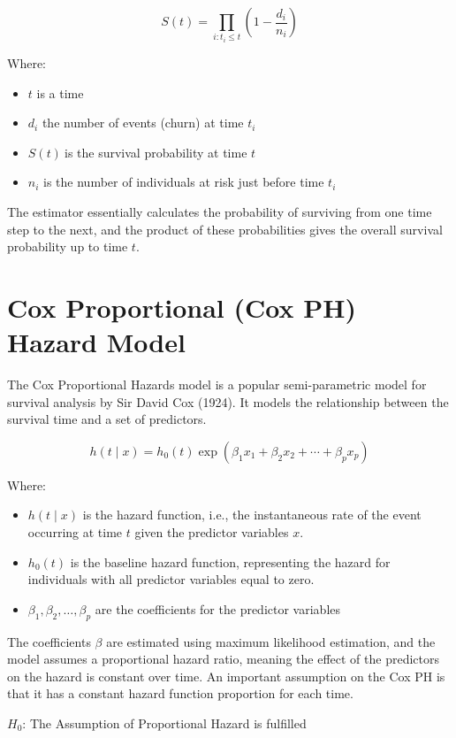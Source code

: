 \documentclass[12pt]{report} %
\begin{document}
\[S\left(t\right)=\prod_{i:t_i\le t}\left(1-\frac{d_i}{n_i}\right)\]

Where:
 \begin{itemize}
     \item \(t\) is a time
     \item \(d_i \) the number of events (churn) at time \(t_i\)
     \item \(S\left(t\right)\ \)is the survival probability at time \(t\)
     \item \(n_i\) is the number of individuals at risk just before time \(t_i\)
 \end{itemize}
The estimator essentially calculates the probability of surviving from one time step to the next, and the product of these probabilities gives the overall survival probability up to time \(t\).

\section{Cox Proportional (Cox PH) Hazard Model}

The Cox Proportional Hazards model is a popular semi-parametric model for survival analysis by Sir David Cox (1924). It models the relationship between the survival time and a set of predictors.

\[
h\left(t \mid x\right) = h_0(t) \exp(\beta_1 x_1 + \beta_2 x_2 + \cdots + \beta_p x_p)
\]

Where:
 \begin{itemize}
     \item \(h(t\mid x)\) is the hazard function, i.e., the instantaneous rate of the event occurring at time \(t\) given the predictor variables \(x\).
     \item \(h_0\left(t\right)\) is the baseline hazard function, representing the hazard for individuals with all predictor variables equal to zero.
     \item \(\beta_1,\beta_2,\ldots,\beta_p\) are the coefficients for the predictor variables
 \end{itemize}

 The coefficients \(\beta\) are estimated using maximum likelihood estimation, and the model assumes a proportional hazard ratio, meaning the effect of the predictors on the hazard is constant over time.
An important assumption on the Cox PH is that it has a constant hazard function proportion for each time.



                                                                \(H_0\): The Assumption of Proportional Hazard is fulfilled 
\end{document}
